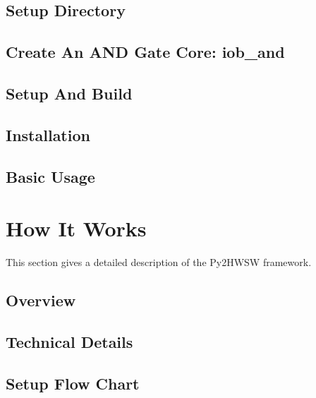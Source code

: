 \documentclass{ug}
\begin{document}
\subsection{Setup Directory}
\label{sec:setup_dir}


\subsection{Create An AND Gate Core: iob\_and}
\label{sec:iob_and}


\subsection{Setup And Build}
\label{sec:setup_build}


\subsection{Installation}
\label{sec:installation}


\subsection{Basic Usage}
\label{sec:basic_usage}


%
%
\ifdefined\SECTIONCLEARPAGE
\clearpage
\fi
\section{How It Works}
\label{sec:how_it_works}

This section gives a detailed description of the Py2HWSW framework.

\subsection{Overview}
\label{sec:py2_overview}


\subsection{Technical Details}
\label{sec:py2_technical_details}


\subsection{Setup Flow Chart}
\label{sec:py2_flow_chart}
\end{document}
